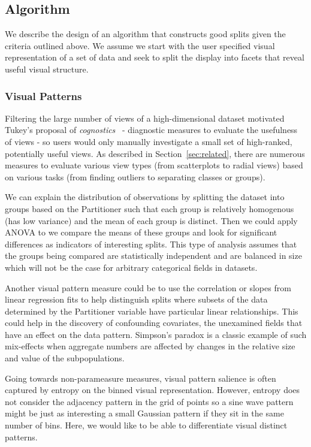 \subsection{Algorithm}
We describe the design of an algorithm that constructs good splits given the criteria outlined above. We assume we start with the user specified visual representation of a set of data and seek to split the display into facets that reveal useful visual structure.

\subsubsection{Visual Patterns}
Filtering the large number of views of a high-dimensional dataset motivated Tukey's proposal of \textit{cognostics}~\cite{Tukey1982,Tukey1985} - diagnostic measures to evaluate the usefulness of views - so users would only manually investigate a small set of high-ranked, potentially useful views. As described in Section~\ref{sec:related}, there are numerous measures to evaluate various view types (from scatterplots to radial views) based on various tasks (from finding outliers to separating classes or groups).

We can explain the distribution of observations by splitting the dataset into groups based on the Partitioner such that each group is relatively homogenous (has low variance) and the mean of each group is distinct. Then we could apply ANOVA to we compare the means of these groups and look for significant differences as indicators of interesting splits. This type of analysis assumes that the groups being compared are statistically independent and are balanced in size which will not be the case for arbitrary categorical fields in datasets. 

Another visual pattern measure could be to use the correlation or slopes from linear regression fits to help distinguish splits where subsets of the data determined by the Partitioner variable have particular linear relationships. This could help in the discovery of confounding covariates, the unexamined fields that have an effect on the data pattern. Simpson's paradox is a classic example of such mix-effects when aggregate numbers are affected by changes in the relative size and value of the subpopulations. 

Going towards non-parameasure measures, visual pattern salience is often captured by entropy on the binned visual representation. However, entropy does not consider the adjacency pattern in the grid of points so a sine wave pattern might be just as interesting a small Gaussian pattern if they sit in the same number of bins. Here, we would like to be able to differentiate visual distinct patterns.


